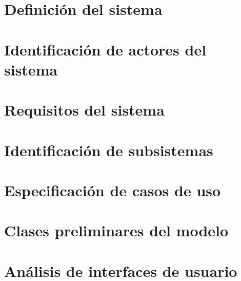 \section{Definición del sistema}
\label{definicion_sistema}



\section{Identificación de actores del sistema}
\label{identificacion_actores}



\section{Requisitos del sistema}
\label{requisitos_sistema}



\section{Identificación de subsistemas}
\label{identificacion_subsistemas}



\section{Especificación de casos de uso}
\label{especificacion_casos_uso}



\section{Clases preliminares del modelo}
\label{clases_preliminares_modelo}



\section{Análisis de interfaces de usuario}
\label{analisis_interfaces_usuario}
